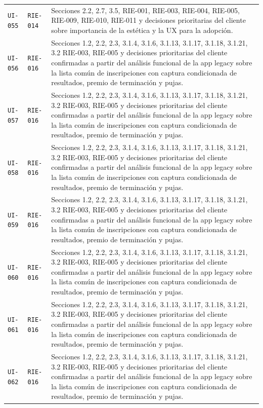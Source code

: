 \documentclass[10pt,letterpaper]{article}
\begin{document}
\begin{landscape}
\begin{longtable}{P{2.7cm}P{2.6cm}P{15.7cm}}
\texttt{UI-055} & \texttt{RIE-014} & Secciones 2.2, 2.7, 3.5, RIE-001, RIE-003, RIE-004, RIE-005, RIE-009, RIE-010, RIE-011 y decisiones prioritarias del cliente sobre importancia de la estética y la UX para la adopción.\\
\texttt{UI-056} & \texttt{RIE-016} & Secciones 1.2, 2.2, 2.3, 3.1.4, 3.1.6, 3.1.13, 3.1.17, 3.1.18, 3.1.21, 3.2 RIE-003, RIE-005 y decisiones prioritarias del cliente confirmadas a partir del análisis funcional de la app legacy sobre la lista común de inscripciones con captura condicionada de resultados, premio de terminación y pujas.\\
\texttt{UI-057} & \texttt{RIE-016} & Secciones 1.2, 2.2, 2.3, 3.1.4, 3.1.6, 3.1.13, 3.1.17, 3.1.18, 3.1.21, 3.2 RIE-003, RIE-005 y decisiones prioritarias del cliente confirmadas a partir del análisis funcional de la app legacy sobre la lista común de inscripciones con captura condicionada de resultados, premio de terminación y pujas.\\
\texttt{UI-058} & \texttt{RIE-016} & Secciones 1.2, 2.2, 2.3, 3.1.4, 3.1.6, 3.1.13, 3.1.17, 3.1.18, 3.1.21, 3.2 RIE-003, RIE-005 y decisiones prioritarias del cliente confirmadas a partir del análisis funcional de la app legacy sobre la lista común de inscripciones con captura condicionada de resultados, premio de terminación y pujas.\\
\texttt{UI-059} & \texttt{RIE-016} & Secciones 1.2, 2.2, 2.3, 3.1.4, 3.1.6, 3.1.13, 3.1.17, 3.1.18, 3.1.21, 3.2 RIE-003, RIE-005 y decisiones prioritarias del cliente confirmadas a partir del análisis funcional de la app legacy sobre la lista común de inscripciones con captura condicionada de resultados, premio de terminación y pujas.\\
\texttt{UI-060} & \texttt{RIE-016} & Secciones 1.2, 2.2, 2.3, 3.1.4, 3.1.6, 3.1.13, 3.1.17, 3.1.18, 3.1.21, 3.2 RIE-003, RIE-005 y decisiones prioritarias del cliente confirmadas a partir del análisis funcional de la app legacy sobre la lista común de inscripciones con captura condicionada de resultados, premio de terminación y pujas.\\
\texttt{UI-061} & \texttt{RIE-016} & Secciones 1.2, 2.2, 2.3, 3.1.4, 3.1.6, 3.1.13, 3.1.17, 3.1.18, 3.1.21, 3.2 RIE-003, RIE-005 y decisiones prioritarias del cliente confirmadas a partir del análisis funcional de la app legacy sobre la lista común de inscripciones con captura condicionada de resultados, premio de terminación y pujas.\\
\texttt{UI-062} & \texttt{RIE-016} & Secciones 1.2, 2.2, 2.3, 3.1.4, 3.1.6, 3.1.13, 3.1.17, 3.1.18, 3.1.21, 3.2 RIE-003, RIE-005 y decisiones prioritarias del cliente confirmadas a partir del análisis funcional de la app legacy sobre la lista común de inscripciones con captura condicionada de resultados, premio de terminación y pujas.\\

\end{longtable}
\end{landscape}
\end{document}
